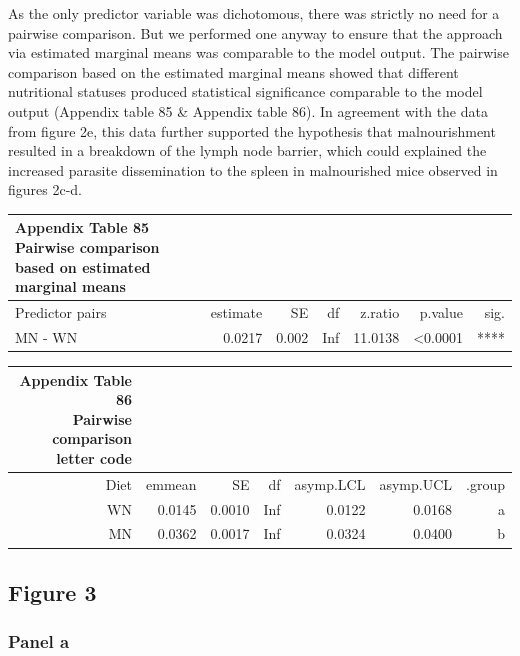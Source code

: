 \documentclass[
  12pt,
  letterpaper,
]{article}
\begin{document}
As the only predictor variable was dichotomous, there was strictly no need for a pairwise comparison. But we performed one anyway to ensure that the approach via estimated marginal means was comparable to the model output. The pairwise comparison based on the estimated marginal means showed that different nutritional statuses produced statistical significance comparable to the model output (Appendix table 85 \& Appendix table 86). In agreement with the data from figure 2e, this data further supported the hypothesis that malnourishment resulted in a breakdown of the lymph node barrier, which could explained the increased parasite dissemination to the spleen in malnourished mice observed in figures 2c-d.

\begingroup
\fontsize{12.0pt}{14.4pt}\selectfont
\begin{longtable}{l|rrrrrr}
\caption*{
{\large \textbf{Appendix Table 85}} \\ 
{\small \textbf{Pairwise comparison based on estimated marginal means}}
} \\ 
\toprule
Predictor pairs & {estimate} & {SE} & {df} & {z.ratio} & {p.value} & {sig.} \\ 
\midrule\addlinespace[2.5pt]
MN - WN & 0.0217 & 0.002 & Inf & 11.0138 & <0.0001 & **** \\ 
\bottomrule
\end{longtable}
\endgroup

\begingroup
\fontsize{12.0pt}{14.4pt}\selectfont
\begin{longtable}{rrrrrrr}
\caption*{
{\large \textbf{Appendix Table 86}} \\ 
{\small \textbf{Pairwise comparison letter code}}
} \\ 
\toprule
{Diet} & {emmean} & {SE} & {df} & {asymp.LCL} & {asymp.UCL} & {.group} \\ 
\midrule\addlinespace[2.5pt]
WN & 0.0145 & 0.0010 & Inf & 0.0122 & 0.0168 &  a  \\ 
MN & 0.0362 & 0.0017 & Inf & 0.0324 & 0.0400 &   b \\ 
\bottomrule
\end{longtable}
\endgroup

\subsection{Figure 3}\label{figure-3}

\subsubsection{Panel a}\label{panel-a-1}
\end{document}
